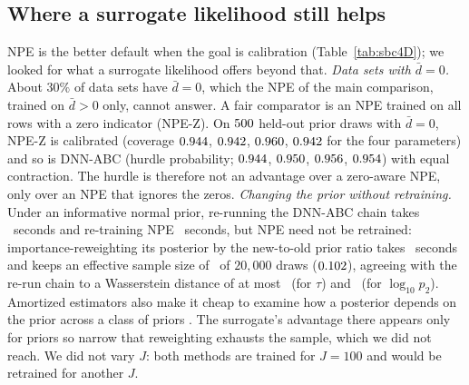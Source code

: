 \documentclass[sn-basic,iicol,pdflatex]{sn-jnl}
\begin{document}
\begin{table}[!t]
\centering
\caption{Does propagating the surrogate's own uncertainty change calibration? Exact importance resampling of the surrogate posterior over the $364$ data sets with $\bar d>0$ (an asterisk marks a coverage more than two standard errors from $0.95$); contraction is of $\log_{10}p_2$; ESS is the median effective sample size of the $2{,}000{,}000$ prior draws}
\label{tab:epist}
\scriptsize\setlength{\tabcolsep}{3pt}

\end{table}

\subsection{Where a surrogate likelihood still helps}
\label{sec:edge}

NPE is the better default when the goal is calibration (Table~\ref{tab:sbc4D}); we looked for what a surrogate likelihood offers beyond that.
\emph{Data sets with $\bar d=0$.} About $30\%$ of data sets have $\bar d=0$, which the NPE of the main comparison, trained on $\bar d>0$ only, cannot answer. A fair comparator is an NPE
trained on all rows with a zero indicator (NPE-Z). On $500$ held-out prior draws with $\bar d=0$, NPE-Z is calibrated (coverage $0.944$, $0.942$,
$0.960$, $0.942$ for the four parameters) and so is DNN-ABC (hurdle probability; $0.944$,
$0.950$, $0.956$, $0.954$) with equal contraction. The hurdle is therefore not an advantage over a
zero-aware NPE, only over an NPE that ignores the zeros.
\emph{Changing the prior without retraining.} Under an informative normal prior, re-running the DNN-ABC chain takes \pfourBPriorChangeMeanDnnAbcRerunS\ seconds and re-training NPE
\pfourBNpeRetrainTrainS\ seconds, but NPE need not be retrained: importance-reweighting its posterior by the new-to-old prior ratio takes \pfourBPriorChangeMeanNpeReweightS\ seconds and keeps an effective
sample size of \pfourBPriorChangeMeanNpeEss\ of $20{,}000$ draws ($0.102$), agreeing with the re-run chain to a Wasserstein distance of at most
\pfourBPriorChangeWassDnnVsNpeTau\ (for $\tau$) and \pfourBPriorChangeWassDnnVsNpeLogPTwo\ (for $\log_{10}p_2$). Amortized estimators also make it cheap to examine how a posterior depends on the prior across a class of priors \citep{wang2026}. The surrogate's advantage there appears only for priors so narrow that reweighting
exhausts the sample, which we did not reach. We did not vary $J$: both methods are trained for $J=100$ and would be retrained for another $J$.
\end{document}
